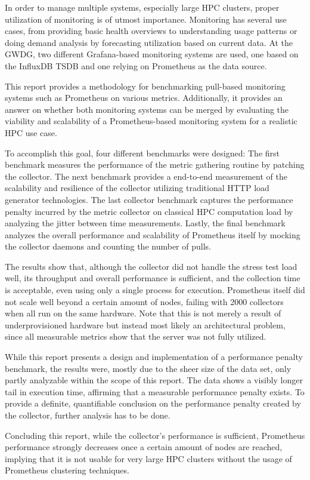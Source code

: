 In order to manage multiple systems, especially large \ac{HPC} clusters, proper utilization of monitoring is of utmost importance.
Monitoring has several use cases, from providing basic health overviews to understanding usage patterns or doing demand analysis by forecasting utilization based on current data.
At the GWDG, two different Grafana-based monitoring systems are used, one based on the InfluxDB \ac{TSDB} and one relying on Prometheus as the data source.

This report provides a methodology for benchmarking pull-based monitoring systems such as Prometheus on various metrics. Additionally, it provides an answer on whether both monitoring systems can be merged by evaluating the viability and scalability of a Prometheus-based monitoring system for a realistic \ac{HPC} use case.

To accomplish this goal, four different benchmarks were designed: The first benchmark measures the performance of the metric gathering routine by patching the collector. The next benchmark provides a end-to-end measurement of the scalability and resilience of the collector utilizing traditional HTTP load generator technologies. The last collector benchmark captures the performance penalty incurred by the metric collector on classical HPC computation load by analyzing the jitter between time measurements. Lastly, the final benchmark analyzes the overall performance and scalability of Prometheus itself by mocking the collector daemons and counting the number of pulls.

The results show that, although the collector did not handle the stress test load well, its throughput and overall performance is sufficient, and the collection time is acceptable, even using only a single process for execution. Prometheus itself did not scale well beyond a certain amount of nodes, failing with 2000 collectors when all run on the same hardware. Note that this is not merely a result of underprovisioned hardware but instead most likely an architectural problem, since all measurable metrics show that the server was not fully utilized.

While this report presents a design and implementation of a performance penalty benchmark, the results were, mostly due to the sheer size of the data set, only partly analyzable within the scope of this report. The data shows a visibly longer tail in execution time, affirming that a measurable performance penalty exists. To provide a definite, quantifiable conclusion on the performance penalty created by the collector, further analysis has to be done.

Concluding this report, while the collector's performance is sufficient, Prometheus performance strongly decreases once a certain amount of nodes are reached, implying that it is not usable for very large \ac{HPC} clusters without the usage of Prometheus clustering techniques.

